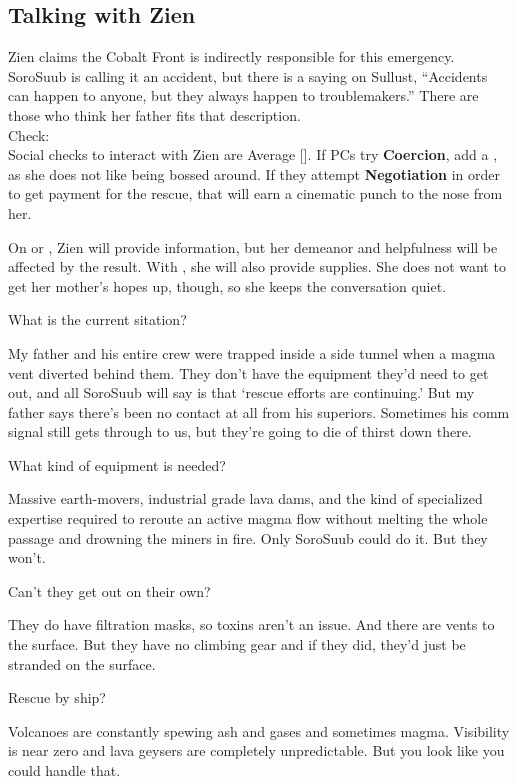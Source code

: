 \documentclass{book}
\newcommand{\df}{\difficulty}
\begin{document}
\begin{multicols*}{2}
\subsection{Talking with Zien}
Zien claims the Cobalt Front is indirectly responsible for this emergency. SoroSuub is calling it an accident, but there is a saying on Sullust, ``Accidents can happen to anyone, but they always happen to troublemakers.''  There are those who think her father fits that description.\\
Check:\\
Social checks to interact with Zien are Average [\df\df]. If PCs try \textbf{Coercion}, add a \setback, as she does not like being bossed around. If they attempt \textbf{Negotiation} in order to get payment for the rescue, that will earn a cinematic punch to the nose from her. 

On \success or \failure, Zien will provide information, but her demeanor and helpfulness will be affected by the result. With \success, she will also provide supplies. She does not want to get her mother's hopes up, though, so she keeps the conversation quiet. 

What is the current sitation?
\begin{quoting}
My father and his entire crew were trapped inside a side tunnel when a magma vent diverted behind them. They don’t have the equipment they’d need to get out, and all SoroSuub will say is that ‘rescue efforts are continuing.’ But my father says there’s been no contact at all from his superiors. Sometimes his comm signal still gets through to us, but they’re going to die of thirst down there.
\end{quoting}

What kind of equipment is needed?
\begin{quoting}
Massive earth-movers, industrial grade lava dams, and the kind of specialized expertise required to reroute an active magma flow without melting the whole passage and drowning the miners in fire. Only SoroSuub could do it. But they won’t.
\end{quoting}

Can't they get out on their own?
\begin{quoting}
They do have filtration masks, so toxins aren’t an issue. And there are vents to the surface. But they have no climbing gear and if they did, they’d just be stranded on the surface.
\end{quoting}

Rescue by ship?
\begin{quoting}
Volcanoes are constantly spewing ash and gases and sometimes magma. Visibility is near zero and lava geysers are completely unpredictable.  But you look like you could handle that.
\end{quoting}


\end{multicols*}
\end{document}
